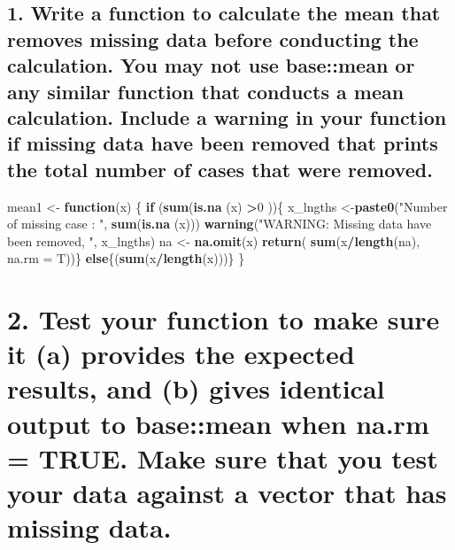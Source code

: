\documentclass[
]{article}
\newenvironment{Shaded}{\begin{snugshade}}{\end{snugshade}}
\newcommand{\ControlFlowTok}[1]{\textcolor[rgb]{0.13,0.29,0.53}{\textbf{#1}}}
\newcommand{\DataTypeTok}[1]{\textcolor[rgb]{0.13,0.29,0.53}{#1}}
\newcommand{\DecValTok}[1]{\textcolor[rgb]{0.00,0.00,0.81}{#1}}
\newcommand{\KeywordTok}[1]{\textcolor[rgb]{0.13,0.29,0.53}{\textbf{#1}}}
\newcommand{\NormalTok}[1]{#1}
\newcommand{\OperatorTok}[1]{\textcolor[rgb]{0.81,0.36,0.00}{\textbf{#1}}}
\newcommand{\StringTok}[1]{\textcolor[rgb]{0.31,0.60,0.02}{#1}}
\begin{document}
\hypertarget{write-a-function-to-calculate-the-mean-that-removes-missing-data-before-conducting-the-calculation.-you-may-not-use-basemean-or-any-similar-function-that-conducts-a-mean-calculation.-include-a-warning-in-your-function-if-missing-data-have-been-removed-that-prints-the-total-number-of-cases-that-were-removed.}{%
\subsection{1. Write a function to calculate the mean that removes
missing data before conducting the calculation. You may not use
base::mean or any similar function that conducts a mean calculation.
Include a warning in your function if missing data have been removed
that prints the total number of cases that were
removed.}\label{write-a-function-to-calculate-the-mean-that-removes-missing-data-before-conducting-the-calculation.-you-may-not-use-basemean-or-any-similar-function-that-conducts-a-mean-calculation.-include-a-warning-in-your-function-if-missing-data-have-been-removed-that-prints-the-total-number-of-cases-that-were-removed.}}

\begin{Shaded}
\begin{Highlighting}[]
\NormalTok{mean1 <-}\StringTok{ }\ControlFlowTok{function}\NormalTok{(x) \{}
  \ControlFlowTok{if}\NormalTok{ (}\KeywordTok{sum}\NormalTok{(}\KeywordTok{is.na}\NormalTok{ (x) }\OperatorTok{>}\DecValTok{0}\NormalTok{ ))\{}
\NormalTok{    x_lngths <-}\KeywordTok{paste0}\NormalTok{(}\StringTok{"Number of missing case : "}\NormalTok{, }\KeywordTok{sum}\NormalTok{(}\KeywordTok{is.na}\NormalTok{ (x)))}
    \KeywordTok{warning}\NormalTok{(}\StringTok{"WARNING: Missing data have been removed, "}\NormalTok{, x_lngths)}
\NormalTok{  na <-}\StringTok{ }\KeywordTok{na.omit}\NormalTok{(x)}
  \KeywordTok{return}\NormalTok{(}
    \KeywordTok{sum}\NormalTok{(x}\OperatorTok{/}\KeywordTok{length}\NormalTok{(na), }\DataTypeTok{na.rm =}\NormalTok{ T))\}}
\ControlFlowTok{else}\NormalTok{\{(}\KeywordTok{sum}\NormalTok{(x}\OperatorTok{/}\KeywordTok{length}\NormalTok{(x)))\}}
\NormalTok{\}}
\end{Highlighting}
\end{Shaded}

\hypertarget{test-your-function-to-make-sure-it-a-provides-the-expected-results-and-b-gives-identical-output-to-basemean-when-na.rm-true.-make-sure-that-you-test-your-data-against-a-vector-that-has-missing-data.}{%
\section{2. Test your function to make sure it (a) provides the expected
results, and (b) gives identical output to base::mean when na.rm = TRUE.
Make sure that you test your data against a vector that has missing
data.}\label{test-your-function-to-make-sure-it-a-provides-the-expected-results-and-b-gives-identical-output-to-basemean-when-na.rm-true.-make-sure-that-you-test-your-data-against-a-vector-that-has-missing-data.}}
\end{document}
